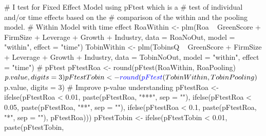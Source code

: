 \documentclass[12pt,]{article}
\newenvironment{Shaded}{}{}
\newcommand{\KeywordTok}[1]{\textcolor[rgb]{0.00,0.00,1.00}{#1}}
\newcommand{\DataTypeTok}[1]{#1}
\newcommand{\DecValTok}[1]{#1}
\newcommand{\FloatTok}[1]{#1}
\newcommand{\StringTok}[1]{\textcolor[rgb]{0.00,0.50,0.50}{#1}}
\newcommand{\CommentTok}[1]{\textcolor[rgb]{0.00,0.50,0.00}{#1}}
\newcommand{\OperatorTok}[1]{#1}
\newcommand{\NormalTok}[1]{#1}
\begin{document}
\begin{Shaded}
\begin{Highlighting}[]
{{{{\CommentTok{# I test for Fixed Effect Model using pFtest which is a}
\CommentTok{# test of individual and/or time effects based on the}
\CommentTok{# comparison of the within and the pooling model.}
\CommentTok{# Within Model with time effect}
\NormalTok{RoaWithin <-}\StringTok{ }\KeywordTok{plm}\NormalTok{(Roa }\OperatorTok{~}\StringTok{ }\NormalTok{GreenScore }\OperatorTok{+}\StringTok{ }\NormalTok{FirmSize }\OperatorTok{+}\StringTok{ }\NormalTok{Leverage }\OperatorTok{+}\StringTok{ }
\StringTok{    }\NormalTok{Growth }\OperatorTok{+}\StringTok{ }\NormalTok{Industry, }\DataTypeTok{data =}\NormalTok{ RoaNoOut, }\DataTypeTok{model =} \StringTok{"within"}\NormalTok{, }
    \DataTypeTok{effect =} \StringTok{"time"}\NormalTok{)}
\NormalTok{TobinWithin <-}\StringTok{ }\KeywordTok{plm}\NormalTok{(TobinsQ }\OperatorTok{~}\StringTok{ }\NormalTok{GreenScore }\OperatorTok{+}\StringTok{ }\NormalTok{FirmSize }\OperatorTok{+}\StringTok{ }\NormalTok{Leverage }\OperatorTok{+}\StringTok{ }
\StringTok{    }\NormalTok{Growth }\OperatorTok{+}\StringTok{ }\NormalTok{Industry, }\DataTypeTok{data =}\NormalTok{ TobinNoOut, }\DataTypeTok{model =} \StringTok{"within"}\NormalTok{, }
    \DataTypeTok{effect =} \StringTok{"time"}\NormalTok{)}
\CommentTok{# pFtest}
\NormalTok{pFtestRoa <-}\StringTok{ }\KeywordTok{round}\NormalTok{(}\KeywordTok{pFtest}\NormalTok{(RoaWithin, RoaPooling)}\OperatorTok{$}\NormalTok{p.value, }
    \DataTypeTok{digits =} \DecValTok{3}\NormalTok{)}
\NormalTok{pFtestTobin <-}\StringTok{ }\KeywordTok{round}\NormalTok{(}\KeywordTok{pFtest}\NormalTok{(TobinWithin, TobinPooling)}\OperatorTok{$}\NormalTok{p.value, }
    \DataTypeTok{digits =} \DecValTok{3}\NormalTok{)}
\CommentTok{# Improve p-value understanding}
\NormalTok{pFtestRoa <-}\StringTok{ }\KeywordTok{ifelse}\NormalTok{(pFtestRoa }\OperatorTok{<}\StringTok{ }\FloatTok{0.01}\NormalTok{, }\KeywordTok{paste}\NormalTok{(pFtestRoa, }\StringTok{"***"}\NormalTok{, }
    \DataTypeTok{sep =} \StringTok{""}\NormalTok{), }\KeywordTok{ifelse}\NormalTok{(pFtestRoa }\OperatorTok{<}\StringTok{ }\FloatTok{0.05}\NormalTok{, }\KeywordTok{paste}\NormalTok{(pFtestRoa, }
    \StringTok{"**"}\NormalTok{, }\DataTypeTok{sep =} \StringTok{""}\NormalTok{), }\KeywordTok{ifelse}\NormalTok{(pFtestRoa }\OperatorTok{<}\StringTok{ }\FloatTok{0.1}\NormalTok{, }\KeywordTok{paste}\NormalTok{(pFtestRoa, }
    \StringTok{"*"}\NormalTok{, }\DataTypeTok{sep =} \StringTok{""}\NormalTok{), pFtestRoa)))}
\NormalTok{pFtestTobin <-}\StringTok{ }\KeywordTok{ifelse}\NormalTok{(pFtestTobin }\OperatorTok{<}\StringTok{ }\FloatTok{0.01}\NormalTok{, }\KeywordTok{paste}\NormalTok{(pFtestTobin, }
}}}}
\end{Highlighting}
\end{Shaded}
\end{document}
